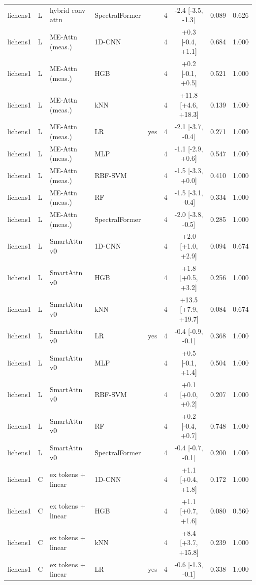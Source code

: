 \begin{tabular}{lllllcccc}
lichens1 & L & hybrid conv attn & SpectralFormer &  & 4 & -2.4 [-3.5, -1.3] & 0.089 & 0.626 \\
lichens1 & L & ME-Attn (meas.) & 1D-CNN &  & 4 & +0.3 [-0.4, +1.1] & 0.684 & 1.000 \\
lichens1 & L & ME-Attn (meas.) & HGB &  & 4 & +0.2 [-0.1, +0.5] & 0.521 & 1.000 \\
lichens1 & L & ME-Attn (meas.) & kNN &  & 4 & +11.8 [+4.6, +18.3] & 0.139 & 1.000 \\
lichens1 & L & ME-Attn (meas.) & LR & yes & 4 & -2.1 [-3.7, -0.4] & 0.271 & 1.000 \\
lichens1 & L & ME-Attn (meas.) & MLP &  & 4 & -1.1 [-2.9, +0.6] & 0.547 & 1.000 \\
lichens1 & L & ME-Attn (meas.) & RBF-SVM &  & 4 & -1.5 [-3.3, +0.0] & 0.410 & 1.000 \\
lichens1 & L & ME-Attn (meas.) & RF &  & 4 & -1.5 [-3.1, -0.4] & 0.334 & 1.000 \\
lichens1 & L & ME-Attn (meas.) & SpectralFormer &  & 4 & -2.0 [-3.8, -0.5] & 0.285 & 1.000 \\
lichens1 & L & SmartAttn v0 & 1D-CNN &  & 4 & +2.0 [+1.0, +2.9] & 0.094 & 0.674 \\
lichens1 & L & SmartAttn v0 & HGB &  & 4 & +1.8 [+0.5, +3.2] & 0.256 & 1.000 \\
lichens1 & L & SmartAttn v0 & kNN &  & 4 & +13.5 [+7.9, +19.7] & 0.084 & 0.674 \\
lichens1 & L & SmartAttn v0 & LR & yes & 4 & -0.4 [-0.9, -0.1] & 0.368 & 1.000 \\
lichens1 & L & SmartAttn v0 & MLP &  & 4 & +0.5 [-0.1, +1.4] & 0.504 & 1.000 \\
lichens1 & L & SmartAttn v0 & RBF-SVM &  & 4 & +0.1 [+0.0, +0.2] & 0.207 & 1.000 \\
lichens1 & L & SmartAttn v0 & RF &  & 4 & +0.2 [-0.4, +0.7] & 0.748 & 1.000 \\
lichens1 & L & SmartAttn v0 & SpectralFormer &  & 4 & -0.4 [-0.7, -0.1] & 0.200 & 1.000 \\
lichens1 & C & ex tokens + linear & 1D-CNN &  & 4 & +1.1 [+0.4, +1.8] & 0.172 & 1.000 \\
lichens1 & C & ex tokens + linear & HGB &  & 4 & +1.1 [+0.7, +1.6] & 0.080 & 0.560 \\
lichens1 & C & ex tokens + linear & kNN &  & 4 & +8.4 [+3.7, +15.8] & 0.239 & 1.000 \\
lichens1 & C & ex tokens + linear & LR & yes & 4 & -0.6 [-1.3, -0.1] & 0.338 & 1.000 \\

\end{tabular}
